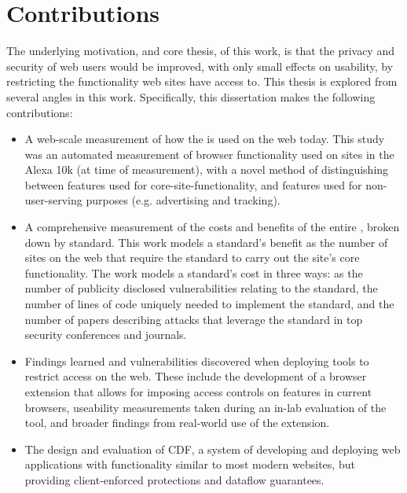 \section{Contributions}
\label{intro:contributions}

The underlying motivation, and core thesis, of this work, is that the privacy
and security of web users would be improved, with only small effects on usability,
by restricting the functionality web sites have access to.  This thesis is
explored from several angles in this work.  Specifically, this dissertation
makes the following contributions:

\begin{itemize}
    \item A web-scale measurement of how the \WAPI is used on the web today.
          This study was an automated measurement of browser functionality
          used on sites in the Alexa 10k (at time of measurement), with
          a novel method of distinguishing between \WAPI features used
          for core-site-functionality, and \WAPI features used for
          non-user-serving purposes (e.g. advertising and tracking).
    \item A comprehensive measurement of the costs and benefits of the entire
          \WAPI, broken down by standard.  This work models a standard's
          benefit as the number of sites on the web that require the standard
          to carry out the site's core functionality.  The work models
          a standard's cost in three ways: as the number of publicity
          disclosed vulnerabilities relating to the standard, the number
          of lines of code uniquely needed to implement the standard, and
          the number of papers describing attacks that leverage the standard
          in top security conferences and journals.
    \item Findings learned and vulnerabilities discovered when deploying
          tools to restrict \WAPI access on the web.  These include the
          development of a browser extension that allows for imposing
          access controls on \WAPI features in current browsers, useability
          measurements taken during an in-lab evaluation of the tool, and
          broader findings from real-world use of the extension.
    \item The design and evaluation of CDF, a system of developing and deploying
          web applications with functionality similar to most modern websites,
          but providing client-enforced protections and dataflow
          guarantees.
\end{itemize}
